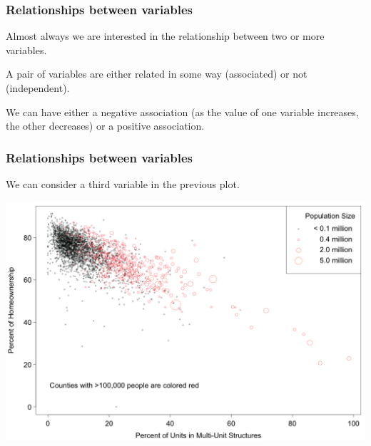 \documentclass[slides]{beamer}
\newcommand{\blue}[1]{\textcolor{blue2}{#1}}
\begin{document}
\begin{frame}
\frametitle{Relationships between variables}
Almost always we are interested in the relationship between two or more variables.

\vspace{0.25cm}

\pause A pair of variables are either related in some way (\blue{associated}) or not (\blue{independent}).

\vspace{0.25cm}

\pause We can have either a \blue{negative association} (as the value of one variable increases, the other decreases) or a \blue{positive association}.

\end{frame}


\begin{frame}[fragile]
\frametitle{Relationships between variables}
We can consider a third variable in the previous plot.
\begin{center}
\includegraphics[width=\textwidth]{figure/MHP.png}
\end{center}
\end{frame}
\end{document}
